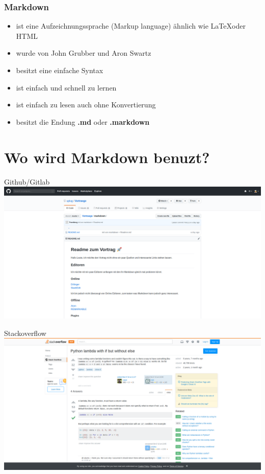 \documentclass{beamer}
\begin{document}
\begin{frame} %
  \frametitle{Markdown} %
    \begin{itemize}
        \item ist eine Aufzeichnungssprache (Markup language) ähnlich wie \LaTeX oder HTML
        \item wurde von John Grubber und Aron Swartz
        \item besitzt eine einfache Syntax
        \item ist einfach und schnell zu lernen
        \item ist einfach zu lesen auch ohne Konvertierung 
        \item besitzt die Endung \textbf{.md} oder \textbf{.markdown}
    \end{itemize}
\end{frame}

\section{Wo wird Markdown benuzt?}


\begin{frame}{Github/Gitlab}
        \includegraphics[scale=0.18]{github.png}
\end{frame}


\begin{frame}{Stackoverflow}
        \includegraphics[scale=0.18]{stackoverflow.png}
\end{frame}
\end{document}
